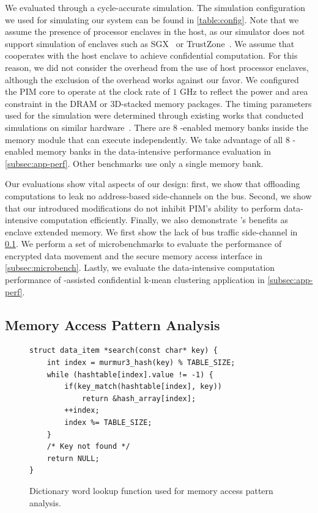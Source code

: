 We evaluated \thename through a cycle-accurate simulation. The simulation configuration we used for simulating our system can be found in \autoref{table:config}. Note that we assume the presence of processor enclaves in the host, as our simulator does not support simulation of enclaves such as SGX~\cite{sgx} or TrustZone~\cite{arm-tz}. We assume that \thename cooperates with the host enclave to achieve confidential computation. For this reason, we did not consider the overhead from the use of host processor enclaves, although the exclusion of the overhead works against our favor. We configured the PIM core to operate at the clock rate of $1$ GHz to reflect the power and area constraint in the DRAM or 3D-stacked memory packages. The timing parameters used for the simulation were determined through existing works that conducted simulations on similar hardware~\cite{smcsim,concurrent-data,tesseract}. There are 8 \thename-enabled memory banks inside the memory module that can execute independently. We take advantage of all 8 \thename-enabled memory banks in the data-intensive performance evaluation in \cref{subsec:app-perf}. Other benchmarks use only a single memory bank.

Our evaluations show vital aspects of our design: first, we show that offloading computations to \thename leak no address-based side-channels on the bus. Second, we show that our introduced modifications do not inhibit PIM's ability to perform data-intensive computation efficiently. Finally, we also demonstrate \thename's benefits as enclave extended memory. We first show the lack of bus traffic side-channel in \cref{subsect:memory-access-pattern}. We perform a set of microbenchmarks to evaluate the performance of encrypted data movement and the secure memory access interface in \cref{subsec:microbench}. Lastly, we evaluate the data-intensive computation performance of \thename-assisted confidential k-mean clustering application in \cref{subsec:app-perf}.








\subsection{Memory Access Pattern Analysis}
\label{subsect:memory-access-pattern}
\begin{figure}[h]
    \centering
    \begin{verbatim}
struct data_item *search(const char* key) {
    int index = murmur3_hash(key) % TABLE_SIZE;
    while (hashtable[index].value != -1) {
        if(key_match(hashtable[index], key))
            return &hash_array[index];
        ++index;
        index %= TABLE_SIZE;
    }
    /* Key not found */
    return NULL;
}
\end{verbatim}
\caption{Dictionary word lookup function used for memory access pattern analysis.}  
\label{lst:search}
\end{figure}


